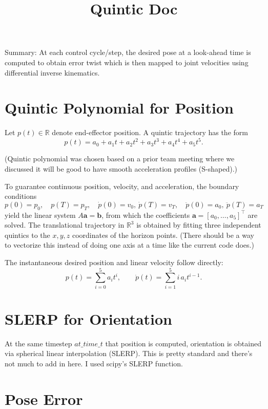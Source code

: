 \documentclass[11pt]{article}
\title{Quintic Doc}
\author{}
\date{}
\begin{document}
\maketitle
\vspace{-3em}


Summary: At each control cycle/step, the desired pose at a look-ahead time is computed to obtain error twist which is then mapped to joint velocities using differential inverse kinematics.

\section*{Quintic Polynomial for Position}

Let $p(t)\in\mathbb{R}$ denote end-effector position.  
A quintic trajectory has the form
\[
p(t)=a_0 + a_1 t + a_2 t^2 + a_3 t^3 + a_4 t^4 + a_5 t^5.
\]

(Quintic polynomial was chosen based on a prior team meeting where we discussed it will be good to have smooth acceleration profiles (S-shaped).)

To guarantee continuous position, velocity, and acceleration, the boundary conditions
\[
p(0)=p_0,\quad p(T)=p_T,\quad 
\dot p(0)=v_0,\ \dot p(T)=v_T,\quad
\ddot p(0)=a_0,\ \ddot p(T)=a_T
\]
yield the linear system $A\mathbf{a}=\mathbf{b}$, from which the coefficients $\mathbf{a}=[a_0,\dots,a_5]^\top$ are solved.  
The translational trajectory in $\mathbb{R}^3$ is obtained by fitting three independent quintics to the $x,y,z$ coordinates of the horizon points. (There should be a way to vectorize this instead of doing one axis at a time like the current code does.)

The instantaneous desired position and linear velocity follow directly:
\[
p(t) = \sum_{i=0}^5 a_i t^i,\qquad
\dot p(t) = \sum_{i=1}^5 i\,a_i t^{i-1}.
\]

\section*{SLERP for Orientation}

At the same timestep $at\_time\_t$ that position is computed, orientation is obtained via spherical linear interpolation (SLERP). This is pretty standard and there's not much to add in here. I used scipy's SLERP function.

\section*{Pose Error}
\end{document}
